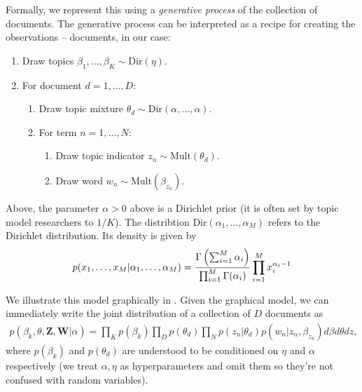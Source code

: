 Formally, we represent this using a \emph{generative process} of the
collection of documents.  The generative process can be interpreted as
a recipe for creating the observations -- documents, in our case:
\begin{enumerate}
  \item Draw topics $\beta_1, \ldots, \beta_K \sim \mbox{Dir}(\eta)$.
    \item For document $d=1, \ldots, D$:
    \begin{enumerate}
    \item Draw topic mixture $\theta_d \sim \mbox{Dir}(\alpha, \ldots, \alpha)$.
    \item For term $n=1, \ldots, N$:
      \begin{enumerate}
      \item Draw topic indicator $z_n \sim \mbox{Mult}(\theta_d)$.
      \item Draw word $w_n \sim \mbox{Mult}(\beta_{z_n})$.
      \end{enumerate}
    \end{enumerate}
\end{enumerate}
Above, the parameter $\alpha > 0$ above is a Dirichlet prior (it is often set by
topic model researchers to $1/K$).  The distribtion $\mbox{Dir}(\alpha_1, \ldots, \alpha_M)$ refers to the Dirichlet distribution.  Its density is given by
\begin{align}
  p(x_1, \ldots, x_M | \alpha_1, \ldots, \alpha_M) =
  \frac{\large \Gamma \left( \sum_{i=1}^M \alpha_i \right)}
       {\prod_{i=1}^M \large \Gamma(\alpha_i)}
       \prod_{i=1}^M x_i^{\alpha_i - 1}
\end{align}

We illustrate this model graphically in .  Given the graphical model, we can immediately write the joint distribution of a collection of $D$ documents as
\begin{align}
  p(\beta_k, \theta, \bm Z, \bm W | \alpha) = 
  \prod_K p(\beta_k)
  \prod_D p(\theta_d) \prod_N p(z_n | \theta_d) p(w_n | z_n, \beta_{z_n}) d\beta d\theta dz,
\end{align}
where $p(\beta_k)$ and $p(\theta_d)$ are understood to be conditioned
on $\eta$ and $\alpha$ respectively (we treat $\alpha, \eta$ as
hyperparameters and omit them so they're not confused with random
variables).

